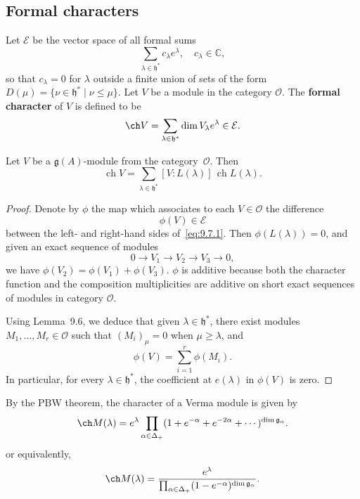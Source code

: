 \documentclass[12pt]{article}
\begin{document}
\subsection{Formal characters}
Let $\mathcal{E}$ be the vector space of all formal sums
\[\sum_{\lambda \in \mathfrak{h}^*} c_\lambda e^\lambda, \quad c_\lambda \in \mathbb{C},\]
so that $c_\lambda = 0$ for $\lambda$ outside a finite union of sets of the form $D(\mu) = \{\nu \in \mathfrak{h}^* \mid \nu \leq \mu\}$. Let $V$ be a module in the category $\mathcal{O}$. The \textbf{formal character} of $V$ is defined to be
\[\ch V = \sum_{\lambda \in \mathfrak{h}^*}\dim V_\lambda e^\lambda \in \mathcal{E}.\]

\begin{proposition}[9.7]
    Let $V$ be a $\mathfrak{g}(A)$-module from the category~$\mathcal{O}$. Then
    \begin{equation}\label{eq:9.7.1}
        \operatorname{ch} V
        = \sum_{\lambda \in \mathfrak{h}^*} [V : L(\lambda)]\, \operatorname{ch} L(\lambda).
    \end{equation}
\end{proposition}

\begin{proof}
    Denote by $\phi$ the map which associates to each $V \in \mathcal{O}$ the difference
    \[
        \phi(V) \in \mathcal{E}
    \]
    between the left- and right-hand sides of~\eqref{eq:9.7.1}.
    Then $\phi(L(\lambda)) = 0$, and given an exact sequence of modules
    \[
        0 \to V_1 \to V_2 \to V_3 \to 0,
    \]
    we have $\phi(V_2) = \phi(V_1) + \phi(V_3)$. $\phi$ is additive because both the character function and the composition multiplicities are additive on short exact sequences of modules in category $\mathcal{O}$.

    Using Lemma~9.6, we deduce that given $\lambda \in \mathfrak{h}^*$, there exist modules
    $M_1,\dots,M_r \in \mathcal{O}$ such that $(M_i)_\mu = 0$ when $\mu \ge \lambda$, and
    \[
        \phi(V) = \sum_{i=1}^r \phi(M_i).
    \]
    In particular, for every $\lambda \in \mathfrak{h}^*$, the coefficient at $e(\lambda)$ in $\phi(V)$ is zero.
\end{proof}

By the PBW theorem, the character of a Verma module is given by
\[
    \ch M(\lambda) = e^\lambda \prod_{\alpha \in \Delta_+} (1 + e^{-\alpha} + e^{-2\alpha} + \cdots)^{\dim \mathfrak{g}_\alpha}.
\] or equivalently,
\[
    \ch M(\lambda) = \frac{e^\lambda}{\prod_{\alpha \in \Delta_+} (1 - e^{-\alpha})^{\dim \mathfrak{g}_\alpha}}.
\]
\end{document}

